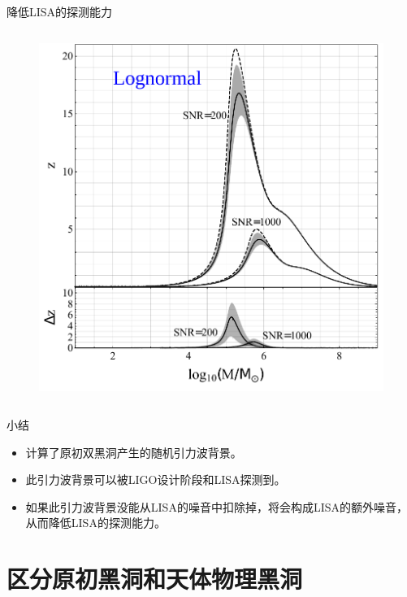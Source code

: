 \documentclass[xcolor={svgnames},compress]{beamer}
\let\olditem\item
\renewcommand{\item}{%
    \olditem\vspace{\fill}}
\begin{document}
\begin{frame}{降低LISA的探测能力}
\begin{columns}
\begin{column}{0.54\textwidth}
\begin{figure}[htbp!]
                \includegraphics[width = \textwidth]{./pic/z-PBH-log01.pdf}
            \end{figure}
        \end{column}
    \end{columns}
\end{frame}

\begin{frame}{小结}	
    \begin{itemize}        
        \item 计算了原初双黑洞产生的随机引力波背景。
        \item 此引力波背景可以被LIGO设计阶段和LISA探测到。
        \item 如果此引力波背景没能从LISA的噪音中扣除掉，将会构成LISA的额外噪音，从而降低LISA的探测能力。
    \end{itemize}
\end{frame}



\section{区分原初黑洞和天体物理黑洞}
\end{document}
